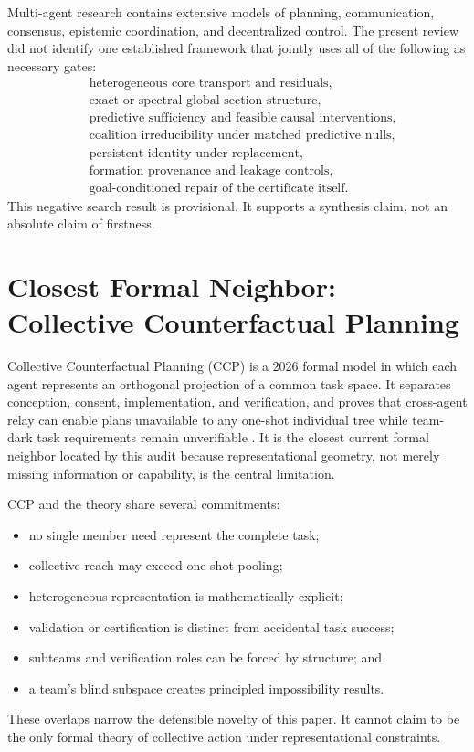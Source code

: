 
Multi-agent research contains extensive models of planning, communication,
consensus, epistemic coordination, and decentralized control. The present
review did not identify one established framework that jointly uses all of the
following as necessary gates:
\[
\begin{aligned}
&\text{heterogeneous core transport and residuals},\\
&\text{exact or spectral global-section structure},\\
&\text{predictive sufficiency and feasible causal interventions},\\
&\text{coalition irreducibility under matched predictive nulls},\\
&\text{persistent identity under replacement},\\
&\text{formation provenance and leakage controls},\\
&\text{goal-conditioned repair of the certificate itself}.
\end{aligned}
\]
This negative search result is provisional. It supports a synthesis claim, not
an absolute claim of firstness.

\section{Closest Formal Neighbor: Collective Counterfactual Planning}


Collective Counterfactual Planning (CCP) is a 2026 formal model in which each
agent represents an orthogonal projection of a common task space. It separates
conception, consent, implementation, and verification, and proves that
cross-agent relay can enable plans unavailable to any one-shot individual tree
while team-dark task requirements remain unverifiable
\cite{SRWT:Amornbunchornvej2026}. It is the closest current formal neighbor located
by this audit because representational geometry, not merely missing
information or capability, is the central limitation.


CCP and the theory share several commitments:
\begin{itemize}
\item no single member need represent the complete task;
\item collective reach may exceed one-shot pooling;
\item heterogeneous representation is mathematically explicit;
\item validation or certification is distinct from accidental task success;
\item subteams and verification roles can be forced by structure; and
\item a team's blind subspace creates principled impossibility results.
\end{itemize}
These overlaps narrow the defensible novelty of this paper. It
cannot claim to be the only formal theory of collective action under
representational constraints.

